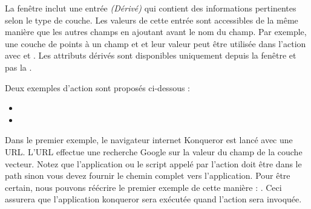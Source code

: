 La fenêtre  inclut une entrée {\em (Dérivé)} qui 
contient des informations pertinentes selon le type de couche. Les valeurs de 
cette entrée sont accessibles de la même manière que les autres champs en 
ajoutant  avant le nom du champ. Par exemple, une couche 
de points à un champ  et  et leur valeur peut être 
utilisée dans l'action avec  et . 
Les attributs dérivés sont disponibles uniquement depuis la fenêtre 
 et pas la .

Deux exemples d'action sont proposés ci-dessous : 

\begin{itemize}[label=--]
  \item {}
  \item {}
\end{itemize}

Dans le premier exemple, le navigateur internet Konqueror est lancé avec une URL. 
L'URL effectue une recherche Google sur la valeur du champ  de la 
couche vecteur. Notez que l'application ou le script appelé par l'action doit 
être dans le path sinon vous devez fournir le chemin complet vers l'application. 
Pour être certain, nous pouvons réécrire le premier exemple de cette manière : 
. Ceci 
assurera que l'application konqueror sera exécutée quand l'action sera invoquée.

